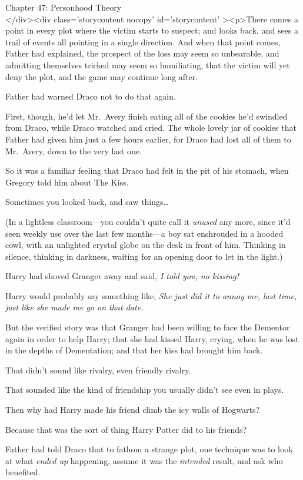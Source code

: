 
Chapter 47: Personhood Theory\\
</div><div  class='storycontent nocopy' id='storycontent' ><p>There comes a 
point in every plot where the victim starts to suspect; and looks back, and 
sees a trail of events all pointing in a single direction. And when that point 
comes, Father had explained, the prospect of the loss may seem so unbearable, 
and admitting themselves tricked may seem so humiliating, that the victim will 
yet deny the plot, and the game may continue long after.

Father had warned Draco not to do that again.

First, though, he'd let Mr.~Avery finish eating all of the cookies he'd 
swindled from Draco, while Draco watched and cried. The whole lovely jar of 
cookies that Father had given him just a few hours earlier, for Draco had lost 
all of them to Mr.~Avery, down to the very last one.

So it was a familiar feeling that Draco had felt in the pit of his stomach, 
when Gregory told him about The Kiss.

Sometimes you looked back, and saw things{\ldots}

(In a lightless classroom---you couldn't quite call it \emph{unused} any more, 
since it'd seen weekly use over the last few months---a boy sat enshrouded in a 
hooded cowl, with an unlighted crystal globe on the desk in front of him. 
Thinking in silence, thinking in darkness, waiting for an opening door to let 
in the light.)

Harry had shoved Granger away and said, \emph{I told you, no kissing!}

Harry would probably say something like, \emph{She just did it to annoy me, 
last time, just like she made me go on that date.}

But the verified story was that Granger had been willing to face the Dementor 
again in order to help Harry; that she had kissed Harry, crying, when he was 
lost in the depths of Dementation; and that her kiss had brought him back.

That didn't sound like rivalry, even friendly rivalry.

That sounded like the kind of friendship you usually didn't see even in plays.

Then why had Harry made his friend climb the icy walls of Hogwarts?

Because that was the sort of thing Harry Potter did to his friends?

Father had told Draco that to fathom a strange plot, one technique was to look 
at what \emph{ended up} happening, assume it was the \emph{intended} result, 
and ask who benefited.

